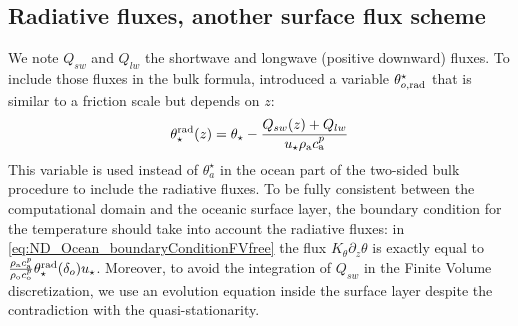\subsection{Radiative fluxes, another surface flux scheme}
\label{sec:ND_Ocean_radiativeFluxes}
We note $Q_{sw}$ and $Q_{lw}$ the shortwave and longwave (positive
downward) fluxes.
To include those fluxes in the
bulk formula, \cite{pelletier_two-sided_2021} introduced
a variable $\theta^\star_{o, \rm rad}$
that is similar to a friction scale but depends on $z$:
\begin{equation}
\theta_\star^{\rm rad}(z) =
	\theta_\star -
	\frac{Q_{sw}(z) + Q_{lw}}{u_{\star}\rho_{\rm a} c_{\rm a}^p}
\end{equation}
This variable is used instead of $\theta^\star_{a}$
in the ocean part of the two-sided bulk procedure
to include the radiative fluxes.
To be fully consistent between the computational domain and
the oceanic surface layer, the boundary condition for the temperature
should take into account the radiative fluxes: in
\eqref{eq:ND_Ocean_boundaryConditionFVfree} the flux
$K_\theta \partial_z \theta$ is exactly equal to
$\frac{\rho_{\rm a} c_{\rm a}^p}{\rho_{\rm o} c_{\rm o}^p}
\theta_\star^{\rm rad}(\delta_o) u_\star$.
Moreover, to avoid the integration of $Q_{sw}$
in the Finite Volume discretization,
we use an evolution equation
inside the surface layer despite the contradiction with
the quasi-stationarity.
%
